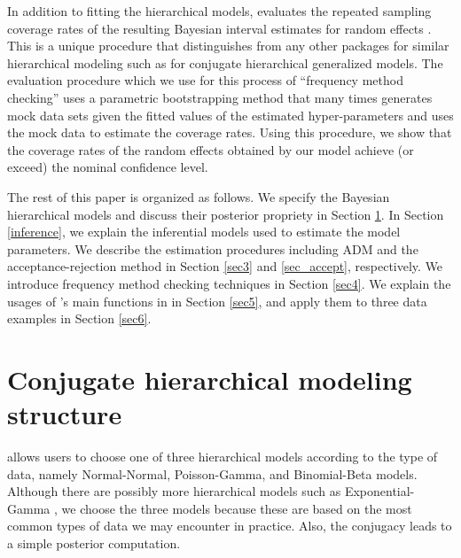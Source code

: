 \documentclass[article]{jss}
\begin{document}
In addition to fitting the hierarchical models,  evaluates the repeated sampling coverage rates of the resulting Bayesian interval estimates for random effects \citep{morris1997, daniels1999prior, tang2002fitting, tang2011, morris2012}. This is a unique procedure that distinguishes   from any other  packages for similar hierarchical modeling such as  \citep{hglm2010, ronnegaard2011hglm} for conjugate hierarchical generalized models. The evaluation procedure which we use for this process of ``frequency method checking'' uses a parametric bootstrapping  method that many times generates mock data sets given the fitted values of the estimated hyper-parameters and uses the mock data to estimate the coverage rates.  Using this procedure, we show that the coverage rates of the random effects obtained by our model achieve (or exceed) the nominal confidence level.

The rest of this paper is organized as follows. We specify the Bayesian hierarchical models and discuss their posterior propriety in Section \ref{sec2}. In Section \ref{inference}, we explain the inferential models used to estimate the model parameters. We describe the estimation procedures including  ADM and the acceptance-rejection method in Section  \ref{sec3} and \ref{sec_accept}, respectively. We introduce  frequency method checking techniques in Section \ref{sec4}.  We explain the usages of 's main functions in  in Section \ref{sec5}, and apply them to three data examples in Section \ref{sec6}.



\section[Hierarchical Structure]{Conjugate hierarchical modeling structure} \label{sec2}


 allows users to choose one of three hierarchical models according to the type of data, namely Normal-Normal, Poisson-Gamma, and Binomial-Beta models. Although there are possibly more hierarchical models such as Exponential-Gamma \citep{tang2002fitting}, we choose the three models because these are based on the most common types of  data we may encounter in practice. Also, the conjugacy leads to a simple posterior computation.
\end{document}
